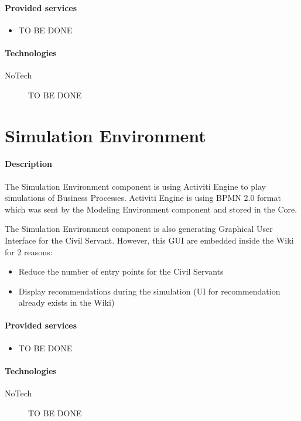 \documentclass{learnpad}
\begin{document}
\paragraph{Provided services}
\begin{itemize}
	\item TO BE DONE
\end{itemize}

\paragraph{Technologies}
\begin{description}
	\item[NoTech] TO BE DONE
\end{description}

\section{Simulation Environment}\label{sec:simulation-environment}
\paragraph{Description}
The Simulation Environment component is using Activiti Engine to play
simulations of Business Processes.  Activiti Engine is using BPMN 2.0 format
which was sent by the Modeling Environment component and stored in the \learnpad
Core.

The Simulation Environment component is also generating Graphical User Interface
for the Civil Servant.  However, this GUI are embedded inside the Wiki for 2
reasons:
\begin{itemize}
	\item Reduce the number of entry points for the Civil Servants
	\item Display recommendations during the simulation (UI for recommendation
		already exists in the Wiki)
\end{itemize}

\paragraph{Provided services}
\begin{itemize}
	\item TO BE DONE
\end{itemize}

\paragraph{Technologies}
\begin{description}
	\item[NoTech] TO BE DONE
\end{description}
\end{document}

